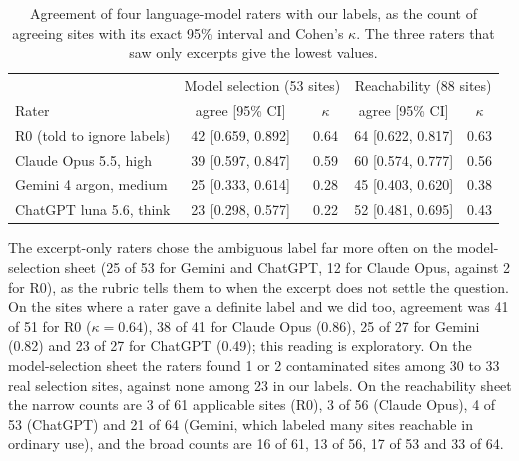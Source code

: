 \documentclass[10pt]{article}
\theoremstyle{definition}
\begin{document}
\begin{table}[h]
\centering\footnotesize\setlength{\tabcolsep}{4pt}
\begin{tabular}{@{}lcccc@{}}
\toprule
 & \multicolumn{2}{c}{Model selection (53 sites)} & \multicolumn{2}{c}{Reachability (88 sites)}\\
Rater & agree [95\% CI] & $\kappa$ & agree [95\% CI] & $\kappa$\\
\midrule
R0 (told to ignore labels) & 42 [0.659, 0.892] & 0.64 & 64 [0.622, 0.817] & 0.63\\
Claude Opus 5.5, high & 39 [0.597, 0.847] & 0.59 & 60 [0.574, 0.777] & 0.56\\
Gemini 4 argon, medium & 25 [0.333, 0.614] & 0.28 & 45 [0.403, 0.620] & 0.38\\
ChatGPT luna 5.6, think & 23 [0.298, 0.577] & 0.22 & 52 [0.481, 0.695] & 0.43\\
\bottomrule
\end{tabular}
\caption{Agreement of four language-model raters with our labels, as the count of agreeing sites with its exact 95\% interval and Cohen's $\kappa$. The three raters that saw only excerpts give the lowest values.}
\label{tab:raters}
\end{table}

The excerpt-only raters chose the ambiguous label far more often on the model-selection sheet (25 of 53 for Gemini and ChatGPT, 12 for Claude Opus, against 2 for R0), as the rubric tells them to when the excerpt does not settle the question. On the sites where a rater gave a definite label and we did too, agreement was 41 of 51 for R0 ($\kappa=0.64$), 38 of 41 for Claude Opus (0.86), 25 of 27 for Gemini (0.82) and 23 of 27 for ChatGPT (0.49); this reading is exploratory. On the model-selection sheet the raters found 1 or 2 contaminated sites among 30 to 33 real selection sites, against none among 23 in our labels. On the reachability sheet the narrow counts are 3 of 61 applicable sites (R0), 3 of 56 (Claude Opus), 4 of 53 (ChatGPT) and 21 of 64 (Gemini, which labeled many sites reachable in ordinary use), and the broad counts are 16 of 61, 13 of 56, 17 of 53 and 33 of 64.
\end{document}
